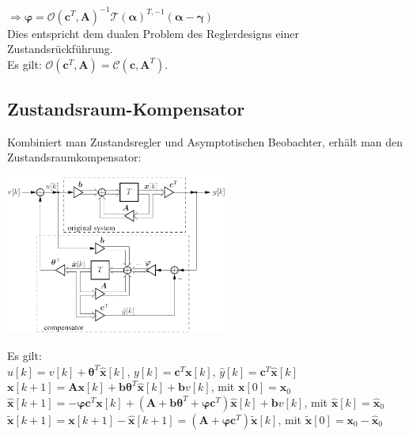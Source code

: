 \documentclass[a4paper,landscape,6pt]{article}
\newcommand{\ma}[1]{\ensuremath{\boldsymbol {#1}}}								%
\renewcommand{\vec}[1]{\ensuremath{\boldsymbol {#1}}}							%
\begin{document}
\begin{multicols}{3}
$\Rightarrow \boxed{\vec \varphi  = \ma{\mathcal{O}}(\vec c^T, \ma A)^{-1}\ma{\mathcal{T}}(\vec \alpha)^{T,-1} (\vec \alpha - \vec \gamma) }$\\

Dies entspricht dem dualen Problem des Reglerdesigns einer Zustandsrückführung.\\
Es gilt: $\ma{\mathcal{O}}(\vec c^T, \ma A) = \ma{\mathcal{C}}(\vec c, \ma A^T)$.
\subsection*{Zustandsraum-Kompensator}
Kombiniert man Zustandsregler und Asymptotischen Beobachter, erhält man den Zustandsraumkompensator:
\begin{minipage}[t]{0.5\textwidth}
	\includegraphics[width=0.55\textwidth]{images_ssp/Compensator}\\
\end{minipage}
Es gilt:\\
$u[k] = v[k] + \vec \theta ^T \hat{\vec{x}}[k]$, $y[k] = \vec c^T \vec x[k]$, $\hat{y}[k] = \vec c^T \hat{\vec{x}}[k]$\\

$\vec x[k+1] = \ma A \vec x[k] + \vec b \vec \theta^T \hat{\vec{x}}[k] + \vec b v[k]$, mit $\vec x[0] = \vec x_0$\\

$\hat{\vec{x}}[k+1] = -\vec\varphi \vec c^T\vec x[k] + (\ma A + \vec b \vec \theta^T + \vec\varphi \vec c^T) \hat{\vec{x}}[k] + \vec b v[k]$, mit $\hat{\vec{x}}[k] = \hat{\vec{x}}_0$\\

$\tilde{\vec{x}}[k+1] = \vec x[k+1] - \hat{\vec{x}}[k+1] = (\ma A + \vec\varphi \vec c^T)\tilde{\vec{x}}[k]$, mit $\tilde{\vec{x}}[0] = \vec x_0 - \hat{\vec{x}}_0$\\


\end{multicols}
\end{document}
